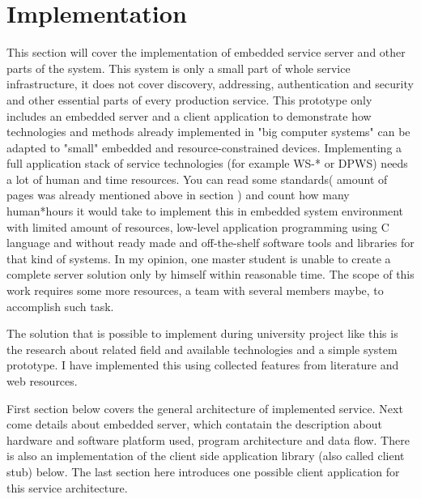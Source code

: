 \newpage
\section{Implementation}
\label{sec:implementation}
This section will cover the implementation of embedded service server and other
parts of the system. This system is only a small part of whole service
infrastructure, it does not cover discovery, addressing, authentication and
security and other essential parts of every production service.
This prototype only includes an embedded server and a client application to
demonstrate how technologies and methods already implemented in "big computer
systems" can be adapted to "small" embedded and resource-constrained devices.
Implementing a full application stack of service technologies (for example WS-*
or \gls{DPWS}) needs a lot of human and time resources. You can read
some standards( amount of pages was already mentioned above in section
) and count how many
human*hours it would take to implement this in embedded system environment with limited amount of resources, low-level
application programming using C language and without ready made and
off-the-shelf software tools and libraries for that kind of systems. In my opinion, one master student
is unable to create a complete server solution only by himself within reasonable
time. The scope of this work requires some more resources, a team with several
members maybe, to accomplish such task.

The solution that is possible to implement during university project like this
is the research about related field and available technologies and a simple
system prototype.
I have implemented this using collected features from literature and web
resources.

First section below covers the general architecture of implemented service.
Next come details about embedded server, which contatain the description about
hardware and software platform used, program architecture and data flow.
There is also an implementation of the client side application library (also
called client stub) below.
The last section here introduces one possible client application for
this service architecture.






